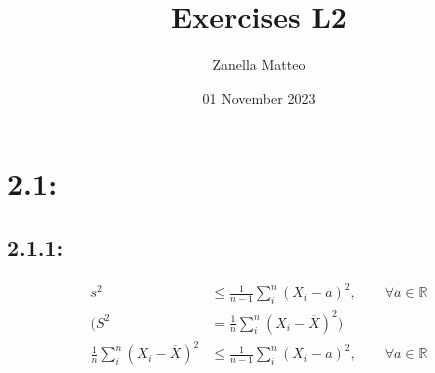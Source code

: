 \documentclass{article}
\title{Exercises L2}
\author{Zanella Matteo}
\date{01 November 2023}
\begin{document}
\maketitle

\section*{2.1:}
\subsection*{2.1.1:}
\begin{align*}
    s^2&\leq\frac{1}{n-1}\sum_{i}^{n}(X_i-a)^2,\qquad\forall a\in\mathbb{R}\\
    \biggl(S^2&=\frac{1}{n}\sum_{i}^{n}(X_i-\overline{X})^2\biggr)\\
    \frac{1}{n}\sum_{i}^{n}(X_i-\overline{X})^2&\leq\frac{1}{n-1}\sum_{i}^{n}(X_i-a)^2,\qquad\forall a\in\mathbb{R}
\end{align*}
\end{document}
